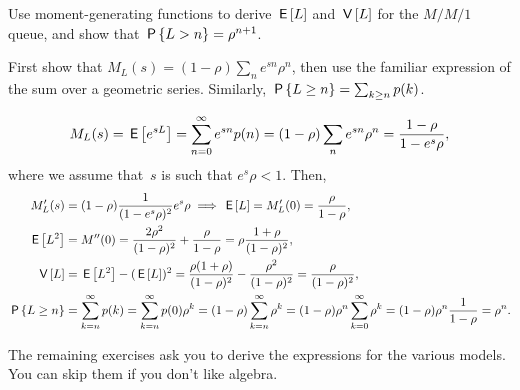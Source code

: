 \documentclass[stochastic-or.tex]{subfiles}
\begin{document}
\begin{exercise}\label{ex:34}
Use moment-generating functions to derive $\E\L$ and $\V\L$ for the $M/M/1$ queue, and show that $\P{L>n} = \rho^{n+1}$.
\begin{hint}
First show that $M_L(s) = (1-\rho) \sum_n e^{s n} \rho^n$, then use the familiar expression of the sum over a geometric series.
Similarly, $\P{\L\geq n} = \sum_{k\geq n} p(k)$.
\end{hint}
\begin{solution}
\begin{equation*}
 M_L(s) = \E{e^{s L}} = \sum_{n=0}^\infty e^{s n}p(n) = (1-\rho) \sum_n e^{s n} \rho^n=\frac{1-\rho}{1-e^{s}\rho},
\end{equation*}
where we assume that~$s$ is such that $e^s \rho < 1$. Then,
\begin{align*}
 M_L'(s) &= (1-\rho) \frac{1}{(1-e^s\rho)^2} e^s \rho \implies \E\L = M_L'(0)= \frac{\rho}{1-\rho}, \\
 \E{\L^2}&= M''(0)= \frac{2\rho^2}{(1-\rho)^2} + \frac{\rho}{1-\rho} = \rho \frac{1+\rho}{(1-\rho)^{2}},\\
\V\L &= \E{L^2} - (\E\L)^2 = \frac{\rho(1+\rho)}{(1-\rho)^2}-\frac{\rho^2}{(1-\rho)^2} = \frac{\rho}{(1-\rho)^2},\\
 \P{\L\geq n}
 &= \sum_{k=n}^\infty p(k) = \sum_{k=n}^\infty p(0)\rho^k = (1-\rho)\sum_{k=n}^\infty \rho^k
= (1-\rho)\rho^n \sum_{k=0}^\infty\rho^k = (1-\rho) \rho^n \frac1{1-\rho} = \rho^n.
\end{align*}
\end{solution}
\end{exercise}


The remaining exercises ask you to derive the  expressions for the various models. You can skip them if you don't like algebra.
\end{document}

